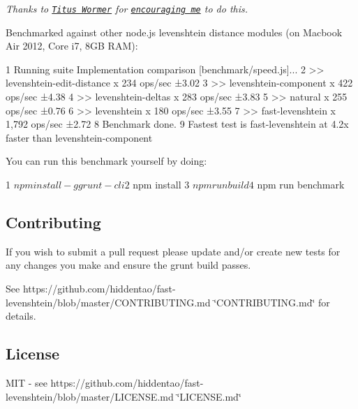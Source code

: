 {\itshape Thanks to \href{https://github.com/wooorm}{\tt Titus Wormer} for \href{https://github.com/hiddentao/fast-levenshtein/issues/1}{\tt encouraging me} to do this.}

Benchmarked against other node.\+js levenshtein distance modules (on Macbook Air 2012, Core i7, 8\+G\+B R\+A\+M)\+:


\begin{DoxyCode}
1 Running suite Implementation comparison [benchmark/speed.js]...
2 >> levenshtein-edit-distance x 234 ops/sec ±3.02%
3 >> levenshtein-component x 422 ops/sec ±4.38%
4 >> levenshtein-deltas x 283 ops/sec ±3.83%
5 >> natural x 255 ops/sec ±0.76%
6 >> levenshtein x 180 ops/sec ±3.55%
7 >> fast-levenshtein x 1,792 ops/sec ±2.72%
8 Benchmark done.
9 Fastest test is fast-levenshtein at 4.2x faster than levenshtein-component
\end{DoxyCode}


You can run this benchmark yourself by doing\+:


\begin{DoxyCode}
1 $ npm install -g grunt-cli
2 $ npm install
3 $ npm run build
4 $ npm run benchmark
\end{DoxyCode}


\subsection*{Contributing}

If you wish to submit a pull request please update and/or create new tests for any changes you make and ensure the grunt build passes.

See https\+://github.com/hiddentao/fast-\/levenshtein/blob/master/\+C\+O\+N\+T\+R\+I\+B\+U\+T\+I\+N\+G.\+md \char`\"{}\+C\+O\+N\+T\+R\+I\+B\+U\+T\+I\+N\+G.\+md\char`\"{} for details.

\subsection*{License}

M\+I\+T -\/ see https\+://github.com/hiddentao/fast-\/levenshtein/blob/master/\+L\+I\+C\+E\+N\+S\+E.\+md \char`\"{}\+L\+I\+C\+E\+N\+S\+E.\+md\char`\"{} 